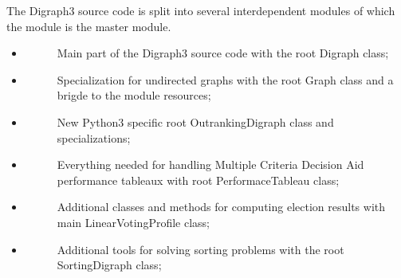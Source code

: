 \documentclass[letterpaper,10pt,english]{sphinxmanual}
\begin{document}
The Digraph3 source code is split into several interdependent modules of which the  module is the master module.
\begin{itemize}
\item {} \begin{description}
\item[{{\hyperref[techDoc:digraphs-label]{\emph{}}}}] \leavevmode
Main part of the Digraph3 source code with the root Digraph class;

\end{description}

\item {} \begin{description}
\item[{{\hyperref[techDoc:graphs-label]{\emph{}}}}] \leavevmode
Specialization for undirected graphs with the root Graph class and a brigde to the  module resources;

\end{description}

\item {} \begin{description}
\item[{{\hyperref[techDoc:outrankingdigraphs-label]{\emph{}}}}] \leavevmode
New Python3 specific root OutrankingDigraph class and specializations;

\end{description}

\item {} \begin{description}
\item[{{\hyperref[techDoc:perftabs-label]{\emph{}}}}] \leavevmode
Everything needed for handling Multiple Criteria Decision Aid performance tableaux with root PerformaceTableau class;

\end{description}

\item {} \begin{description}
\item[{{\hyperref[techDoc:votingdigraphs-label]{\emph{}}}}] \leavevmode
Additional classes and methods for computing election results with main LinearVotingProfile class;

\end{description}

\item {} \begin{description}
\item[{{\hyperref[techDoc:sortingdigraphs-label]{\emph{}}}}] \leavevmode
Additional tools for solving sorting problems with the root SortingDigraph class;


\end{description}
\end{itemize}
\end{document}

